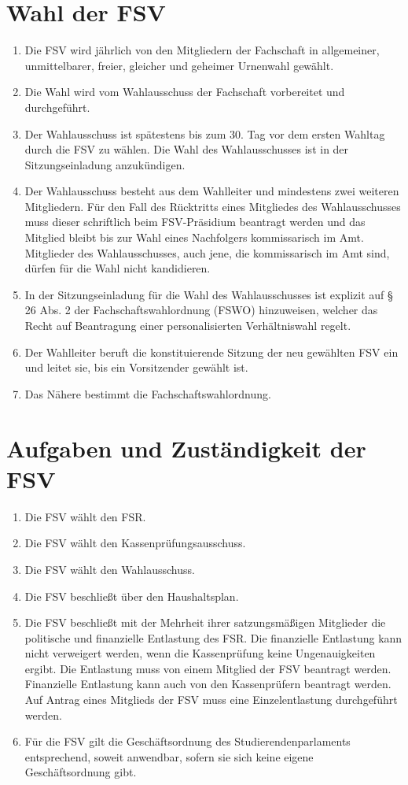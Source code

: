 \documentclass{article}
\begin{document}
\section{Wahl der FSV}\label{wahl-der-fsv}
\begin{enumerate}[(1)]
	\item Die FSV wird jährlich von den Mitgliedern der Fachschaft in allgemeiner, unmittelbarer, freier, gleicher und geheimer Urnenwahl gewählt.
	\item Die Wahl wird vom Wahlausschuss der Fachschaft vorbereitet und durchgeführt.
	\item Der Wahlausschuss ist spätestens bis zum 30. Tag vor dem ersten Wahltag durch die FSV zu wählen. Die Wahl des Wahlausschusses ist in der Sitzungseinladung anzukündigen.
	\item Der Wahlausschuss besteht aus dem Wahlleiter und mindestens zwei weiteren Mitgliedern. Für den Fall des Rücktritts eines Mitgliedes des Wahlausschusses muss dieser schriftlich beim FSV-Präsidium beantragt werden und das Mitglied bleibt bis zur Wahl eines Nachfolgers kommissarisch im Amt. Mitglieder des Wahlausschusses, auch jene, die kommissarisch im Amt sind, dürfen für die Wahl nicht kandidieren.
	\item In der Sitzungseinladung für die Wahl des Wahlausschusses ist explizit auf § 26 Abs. 2 der Fachschaftswahlordnung (FSWO) hinzuweisen, welcher das Recht auf Beantragung einer personalisierten Verhältniswahl regelt.
	\item Der Wahlleiter beruft die konstituierende Sitzung der neu gewählten FSV ein und leitet sie, bis ein Vorsitzender gewählt ist.
	\item Das Nähere bestimmt die Fachschaftswahlordnung.
\end{enumerate}

\section{Aufgaben und Zuständigkeit der FSV}\label{aufgaben-und-zustuxe4ndigkeit-der-fsv}

\begin{enumerate}[(1)]
	\item Die FSV wählt den FSR.
	\item Die FSV wählt den Kassenprüfungsausschuss.
	\item Die FSV wählt den Wahlausschuss.
	\item Die FSV beschließt über den Haushaltsplan.
	\item Die FSV beschließt mit der Mehrheit ihrer satzungsmäßigen Mitglieder die politische und finanzielle Entlastung des FSR. Die finanzielle Entlastung kann nicht verweigert werden, wenn die Kassenprüfung keine Ungenauigkeiten ergibt. Die Entlastung muss von einem Mitglied der FSV beantragt werden. Finanzielle Entlastung kann auch von den Kassenprüfern beantragt werden. Auf Antrag eines Mitglieds der FSV muss eine Einzelentlastung durchgeführt werden.
	\item Für die FSV gilt die Geschäftsordnung des Studierendenparlaments entsprechend, soweit anwendbar, sofern sie sich keine eigene Geschäftsordnung gibt.
\end{enumerate}
\end{document}
